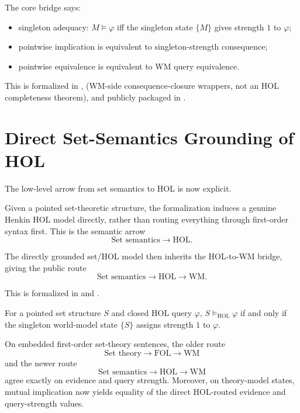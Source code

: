 \documentclass[11pt,openany]{report}
\begin{document}
The core bridge says:
\begin{itemize}
\item singleton adequacy: $M \models \varphi$ iff the singleton state
  $\{M\}$ gives strength $1$ to $\varphi$;
\item pointwise implication is equivalent to singleton-strength consequence;
\item pointwise equivalence is equivalent to WM query equivalence.
\end{itemize}

This is formalized in
,
(WM-side consequence-closure wrappers, not an HOL completeness theorem),
and publicly packaged in
.

\section{Direct Set-Semantics Grounding of HOL}

The low-level arrow from set semantics to HOL is now explicit.

Given a pointed set-theoretic structure, the formalization induces a genuine
Henkin HOL model directly, rather than routing everything through first-order
syntax first.  This is the semantic arrow
\[
  \text{Set semantics} \longrightarrow \text{HOL}.
\]

The directly grounded set/HOL model then inherits the HOL-to-WM bridge, giving
the public route
\[
  \text{Set semantics} \longrightarrow \text{HOL} \longrightarrow \text{WM}.
\]

This is formalized in
 and
.

\begin{theorem}
For a pointed set structure $S$ and closed HOL query $\varphi$,
$S \models_{\mathrm{HOL}} \varphi$ if and only if the singleton world-model
state $\{S\}$ assigns strength $1$ to $\varphi$.
\end{theorem}

On embedded first-order set-theory sentences, the older route
\[
  \text{Set theory} \longrightarrow \text{FOL} \longrightarrow \text{WM}
\]
and the newer route
\[
  \text{Set semantics} \longrightarrow \text{HOL} \longrightarrow \text{WM}
\]
agree exactly on evidence and query strength.  Moreover, on theory-model
states, mutual implication now yields equality of the direct HOL-routed
evidence and query-strength values.
\end{document}
